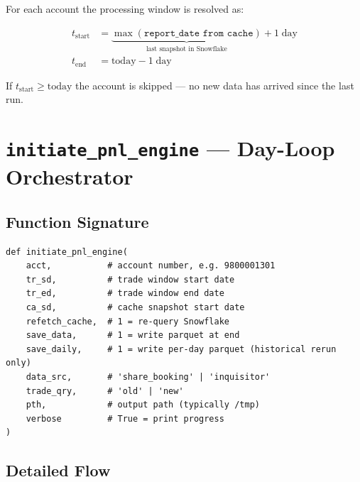 \documentclass[11pt, a4paper]{article}
\begin{document}
For each account the processing window is resolved as:

\begin{align}
  t_{\text{start}} &= \underbrace{\max(\texttt{report\_date from cache})}_{\text{last snapshot in Snowflake}} + 1\;\text{day}
  \label{eq:tstart}\\
  t_{\text{end}}   &= \text{today} - 1\;\text{day}
  \label{eq:tend}
\end{align}

If $t_{\text{start}} \ge \text{today}$ the account is skipped —
no new data has arrived since the last run.

\section{\texttt{initiate\_pnl\_engine} — Day-Loop Orchestrator}

\subsection{Function Signature}

\begin{lstlisting}[style=pycode]
def initiate_pnl_engine(
    acct,           # account number, e.g. 9800001301
    tr_sd,          # trade window start date
    tr_ed,          # trade window end date
    ca_sd,          # cache snapshot start date
    refetch_cache,  # 1 = re-query Snowflake
    save_data,      # 1 = write parquet at end
    save_daily,     # 1 = write per-day parquet (historical rerun only)
    data_src,       # 'share_booking' | 'inquisitor'
    trade_qry,      # 'old' | 'new'
    pth,            # output path (typically /tmp)
    verbose         # True = print progress
)
\end{lstlisting}

\subsection{Detailed Flow}
\end{document}
